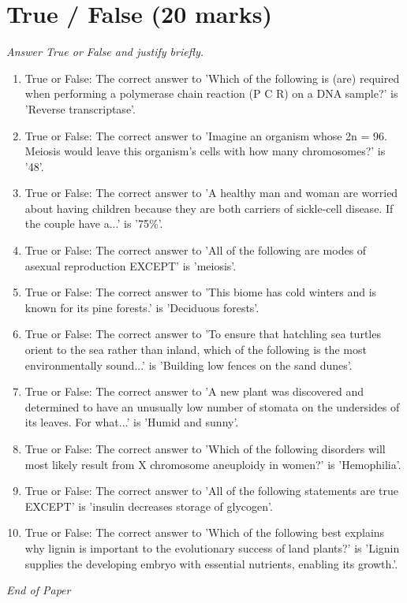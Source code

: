 \documentclass[12pt]{article}
\begin{document}
\section*{True / False (20 marks)}
\textit{Answer True or False and justify briefly.}
\begin{enumerate}[label=\arabic*.]
\item True or False: The correct answer to 'Which of the following is (are) required when performing a polymerase chain reaction (P C R) on a DNA sample?' is 'Reverse transcriptase'.
\item True or False: The correct answer to 'Imagine an organism whose 2n = 96. Meiosis would leave this organism's cells with how many chromosomes?' is '48'.
\item True or False: The correct answer to 'A healthy man and woman are worried about having children because they are both carriers of sickle-cell disease. If the couple have a...' is '75\%'.
\item True or False: The correct answer to 'All of the following are modes of asexual reproduction EXCEPT' is 'meiosis'.
\item True or False: The correct answer to 'This biome has cold winters and is known for its pine forests.' is 'Deciduous forests'.
\item True or False: The correct answer to 'To ensure that hatchling sea turtles orient to the sea rather than inland, which of the following is the most environmentally sound...' is 'Building low fences on the sand dunes'.
\item True or False: The correct answer to 'A new plant was discovered and determined to have an unusually low number of stomata on the undersides of its leaves. For what...' is 'Humid and sunny'.
\item True or False: The correct answer to 'Which of the following disorders will most likely result from X chromosome aneuploidy in women?' is 'Hemophilia'.
\item True or False: The correct answer to 'All of the following statements are true EXCEPT' is 'insulin decreases storage of glycogen'.
\item True or False: The correct answer to 'Which of the following best explains why lignin is important to the evolutionary success of land plants?' is 'Lignin supplies the developing embryo with essential nutrients, enabling its growth.'.
\end{enumerate}

\vfill
\noindent\textit{End of Paper}
\end{document}
